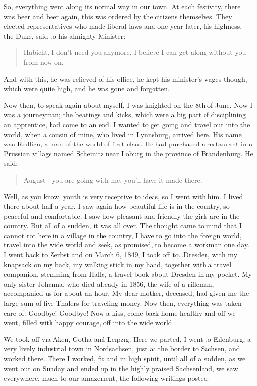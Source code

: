 So, everything went along its normal way in our town. At each festivity, there was beer and beer again, this was ordered by the citizens themselves. They elected representatives who made liberal laws and one year later, his highness, the Duke, said to his almighty Minister:

\begin{quote}
Habicht, I don't need you anymore, I believe I can get along without you from now on.
\end{quote}

And with this, he was relieved of his office, he kept his minister's wages though, which were quite high, and he was gone and forgotten.

Now then, to speak again about myself, I was knighted on the 8th of June. Now I was a journeyman; the beatings and kicks, which were a big part of disciplining an apprentice, had come to an end. I wanted to get going and travel out into the world, when a cousin of mine, who lived in Lynnsburg, arrived here. His name was Redlicn, a man of the world of first class. He had purchased a restaurant in a Prussian village named Scheinitz near Loburg in the province of Brandenburg. He said:

\begin{quote}
August - you are going with me, you'll have it made there.
\end{quote}

Well, as you know, youth is very receptive to ideas, so I went with him. I lived there about half a year. I saw again how beautiful life is in the country, so peaceful and comfortable. I saw how pleasant and friendly the girls are in the country. But all of a sudden, it was all over. The thought came to mind that I cannot rot here in a village in the country, I have to go into the foreign world, travel into the wide world and seek, as promised, to become a workman one day. I went back to Zerbst and on March 6, 1849, I took off to\ldots Dresden, with my knapsack on my back, my walking stick in my hand, together with a travel companion, stemming from Halle, a travel book about Dresden in my pocket. My only sister Johanna, who died already in 1856, the wife of a rifleman, accompanied us for about an hour. My dear mother, deceased, had given me the large sum of five Thalers for traveling money. Now then, everything was taken care of. Goodbye! Goodbye! Now a kiss, come back home healthy and off we went, filled with happy courage, off into the wide world.

We took off via Aken, Gotha and Leipzig. Here we parted, I went to Eilenburg, a very lively industrial town in Nordsachsen, just at the border to Sachsen, and worked there. There I worked, fit and in high spirit, until all of a sudden, as we went out on Sunday and ended up in the highly praised Sachsenland, we saw everywhere, much to our amazement, the following writings posted:

